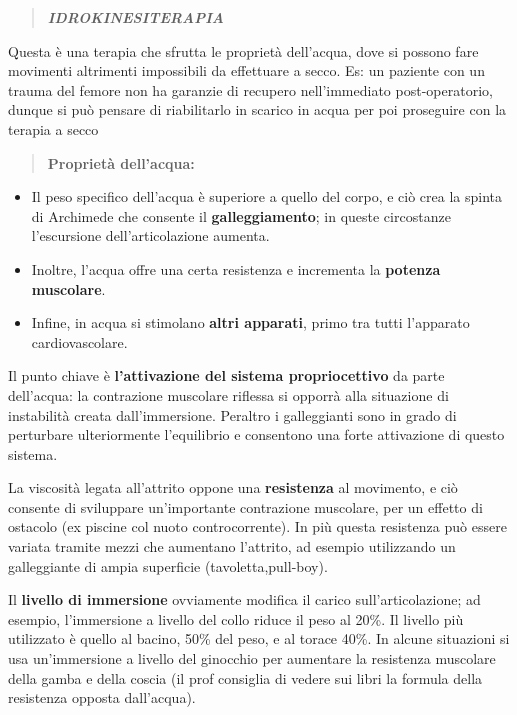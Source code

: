 \documentclass[]{article}
\begin{document}
\begin{quote}
\textbf{\emph{IDROKINESITERAPIA}}
\end{quote}

Questa è una terapia che sfrutta le proprietà dell'acqua, dove si
possono fare movimenti altrimenti impossibili da effettuare a secco. Es:
un paziente con un trauma del femore non ha garanzie di recupero
nell'immediato post-operatorio, dunque si può pensare di riabilitarlo in
scarico in acqua per poi proseguire con la terapia a secco

\begin{quote}
\textbf{Proprietà dell'acqua:}
\end{quote}

\begin{itemize}
\item
  Il peso specifico dell'acqua è superiore a quello del corpo, e ciò
  crea la spinta di Archimede che consente il \textbf{galleggiamento};
  in queste circostanze l'escursione dell'articolazione aumenta.
\item
  Inoltre, l'acqua offre una certa resistenza e incrementa la
  \textbf{potenza muscolare}.
\item
  Infine, in acqua si stimolano \textbf{altri apparati}, primo tra tutti
  l'apparato cardiovascolare.
\end{itemize}

Il punto chiave è \textbf{l'attivazione del sistema propriocettivo} da
parte dell'acqua: la contrazione muscolare riflessa si opporrà alla
situazione di instabilità creata dall'immersione. Peraltro i
galleggianti sono in grado di perturbare ulteriormente l'equilibrio e
consentono una forte attivazione di questo sistema.

La viscosità legata all'attrito oppone una \textbf{resistenza} al
movimento, e ciò consente di sviluppare un'importante contrazione
muscolare, per un effetto di ostacolo (ex piscine col nuoto
controcorrente). In più questa resistenza può essere variata tramite
mezzi che aumentano l'attrito, ad esempio utilizzando un galleggiante di
ampia superficie (tavoletta,pull-boy).

Il \textbf{livello di immersione} ovviamente modifica il carico
sull'articolazione; ad esempio, l'immersione a livello del collo riduce
il peso al 20\%. Il livello più utilizzato è quello al bacino, 50\% del
peso, e al torace 40\%. In alcune situazioni si usa un'immersione a
livello del ginocchio per aumentare la resistenza muscolare della gamba
e della coscia (il prof consiglia di vedere sui libri la formula della
resistenza opposta dall'acqua).
\end{document}
